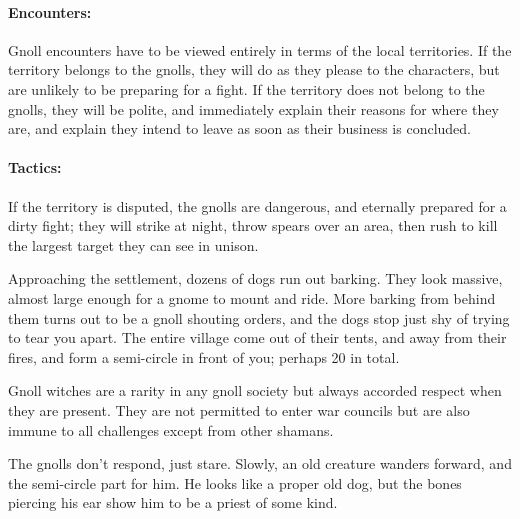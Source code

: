 \begin{multicols}{2}
\showStdSpells

\label{best_gnolls}

\label{gnoll_hunter}



\paragraph{Encounters:} Gnoll encounters have to be viewed entirely in terms of the local territories.
If the territory belongs to the gnolls, they will do as they please to the characters, but are unlikely to be preparing for a fight.
If the territory does not belong to the gnolls, they will be polite, and immediately explain their reasons for where they are, and explain they intend to leave as soon as their business is concluded.
\paragraph{Tactics:}
If the territory is disputed, the gnolls are dangerous, and eternally prepared for a dirty fight; they will strike at night, throw spears over an area, then rush to kill the largest target they can see in unison.

\begin{boxtext}

  Approaching the settlement, dozens of dogs run out barking.
  They look massive, almost large enough for a gnome to mount and ride.
  More barking from behind them turns out to be a gnoll shouting orders, and the dogs stop just shy of trying to tear you apart.
  The entire village come out of their tents, and away from their fires, and form a semi-circle in front of you; perhaps 20 in total.

\end{boxtext}

\label{gnoll_shaman}

Gnoll witches are a rarity in any gnoll society but always accorded respect when they are present.
They are not permitted to enter war councils but are also immune to all challenges except from other shamans.


\begin{boxtext}

  The gnolls don't respond, just stare.  
  Slowly, an old creature wanders forward, and the semi-circle part for him.
  He looks like a proper old dog, but the bones piercing his ear show him to be a priest of some kind.


\end{boxtext}
\end{multicols}
